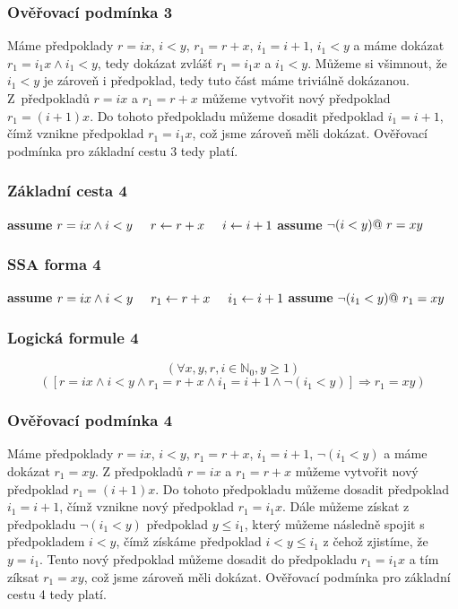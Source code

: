 \documentclass{article}
\newcommand\tab[1][0.5cm]{\hspace*{#1}}
\newcommand{\N}{\mathbb{N}}
\begin{document}
\subsubsection{Ověřovací podmínka 3}
Máme předpoklady $r = ix$, $i < y$, $r_1 = r + x$, $i_1 = i + 1$, $i_1 < y$ a máme dokázat $r_1 = i_1x \wedge i_1 < y$, tedy dokázat zvlášť $r_1 = i_1x$ a $i_1 < y$. Můžeme si všimnout, že $i_1 < y$ je zároveň i předpoklad, tedy tuto část máme triviálně dokázanou. Z~předpokladů $r = ix$ a $r_1 = r + x$ můžeme vytvořit nový předpoklad $r_1 = (i + 1)x$. Do tohoto předpokladu můžeme dosadit předpoklad $i_1 = i + 1$, čímž vznikne předpoklad $r_1 = i_1x$, což jsme zároveň měli dokázat. Ověřovací podmínka pro základní cestu 3 tedy platí.

\subsubsection{Základní cesta 4}
\textbf{assume} $r = ix \wedge i < y \newline \tab r \leftarrow r + x \newline \tab i \leftarrow i + 1 \newline$ \textbf{assume} $\neg(i < y) \newline @\ r = xy$

\subsubsection{SSA forma 4}
\textbf{assume} $r = ix \wedge i < y \newline \tab r_1 \leftarrow r + x \newline \tab i_1 \leftarrow i + 1 \newline$ \textbf{assume} $\neg(i_1 < y) \newline @\ r_1 = xy$
\subsubsection{Logická formule 4}
$$(\forall x,y,r,i \in \N_0, y \geq 1)$$ $$([r = ix \wedge i < y \wedge r_1 = r + x \wedge i_1 = i + 1 \wedge \neg(i_1 < y)] \Rightarrow r_1 = xy )$$

\subsubsection{Ověřovací podmínka 4}
Máme předpoklady $r = ix$, $i < y$, $r_1 = r + x$, $i_1 = i + 1$, $\neg(i_1 < y)$ a máme dokázat $r_1 = xy$. Z předpokladů $r = ix$ a $r_1 = r + x$ můžeme vytvořit nový předpoklad $r_1 = (i + 1)x$. Do tohoto předpokladu můžeme dosadit předpoklad $i_1 = i + 1$, čímž vznikne nový předpoklad $r_1 = i_1x$. Dále můžeme získat z~ předpokladu $\neg(i_1 < y)$ předpoklad $y \leq i_1$, který můžeme následně spojit s předpokladem $i < y$, čímž získáme předpoklad $i < y \leq i_1$ z čehož zjistíme, že $y = i_1$. Tento nový předpoklad můžeme dosadit do předpokladu $r_1 = i_1x$ a tím zíksat $r_1 = xy$, což jsme zároveň měli dokázat. Ověřovací podmínka pro základní cestu 4 tedy platí.
\end{document}
